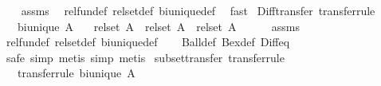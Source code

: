 \begin{isabellebody}
%
\isadelimproof
\ \ %
\endisadelimproof
%
\isatagproof
{}\isamarkupfalse%
\ assms\ \isamarkupfalse%
\ rel{\isacharunderscore}{\kern0pt}fun{\isacharunderscore}{\kern0pt}def\ rel{\isacharunderscore}{\kern0pt}set{\isacharunderscore}{\kern0pt}def\ bi{\isacharunderscore}{\kern0pt}unique{\isacharunderscore}{\kern0pt}def\ \isamarkupfalse%
\ fast%
\endisatagproof
{\isafoldproof}%
%
\isadelimproof
\isanewline
%
\endisadelimproof
\isanewline
{}\isamarkupfalse%
\ Diff{\isacharunderscore}{\kern0pt}transfer\ {\isacharbrackleft}{\kern0pt}transfer{\isacharunderscore}{\kern0pt}rule{\isacharbrackright}{\kern0pt}{\isacharcolon}{\kern0pt}\isanewline
\ \ \ {\isachardoublequoteopen}bi{\isacharunderscore}{\kern0pt}unique\ A{\isachardoublequoteclose}\isanewline
\ \ \ {\isachardoublequoteopen}{\isacharparenleft}{\kern0pt}rel{\isacharunderscore}{\kern0pt}set\ A\ {\isacharequal}{\kern0pt}{\isacharequal}{\kern0pt}{\isacharequal}{\kern0pt}{\isachargreater}{\kern0pt}\ rel{\isacharunderscore}{\kern0pt}set\ A\ {\isacharequal}{\kern0pt}{\isacharequal}{\kern0pt}{\isacharequal}{\kern0pt}{\isachargreater}{\kern0pt}\ rel{\isacharunderscore}{\kern0pt}set\ A{\isacharparenright}{\kern0pt}\ {\isacharparenleft}{\kern0pt}{\isacharminus}{\kern0pt}{\isacharparenright}{\kern0pt}\ {\isacharparenleft}{\kern0pt}{\isacharminus}{\kern0pt}{\isacharparenright}{\kern0pt}{\isachardoublequoteclose}\isanewline
%
\isadelimproof
\ \ %
\endisadelimproof
%
\isatagproof
{}\isamarkupfalse%
\ assms\ \isamarkupfalse%
\ rel{\isacharunderscore}{\kern0pt}fun{\isacharunderscore}{\kern0pt}def\ rel{\isacharunderscore}{\kern0pt}set{\isacharunderscore}{\kern0pt}def\ bi{\isacharunderscore}{\kern0pt}unique{\isacharunderscore}{\kern0pt}def\isanewline
\ \ \isamarkupfalse%
\ Ball{\isacharunderscore}{\kern0pt}def\ Bex{\isacharunderscore}{\kern0pt}def\ Diff{\isacharunderscore}{\kern0pt}eq\isanewline
\ \ \isamarkupfalse%
\ {\isacharparenleft}{\kern0pt}safe{\isacharcomma}{\kern0pt}\ simp{\isacharcomma}{\kern0pt}\ metis{\isacharcomma}{\kern0pt}\ simp{\isacharcomma}{\kern0pt}\ metis{\isacharparenright}{\kern0pt}%
\endisatagproof
{\isafoldproof}%
%
\isadelimproof
\isanewline
%
\endisadelimproof
\isanewline
{}\isamarkupfalse%
\ subset{\isacharunderscore}{\kern0pt}transfer\ {\isacharbrackleft}{\kern0pt}transfer{\isacharunderscore}{\kern0pt}rule{\isacharbrackright}{\kern0pt}{\isacharcolon}{\kern0pt}\isanewline
\ \ \ {\isacharbrackleft}{\kern0pt}transfer{\isacharunderscore}{\kern0pt}rule{\isacharbrackright}{\kern0pt}{\isacharcolon}{\kern0pt}\ {\isachardoublequoteopen}bi{\isacharunderscore}{\kern0pt}unique\ A{\isachardoublequoteclose}\isanewline

\end{isabellebody}
